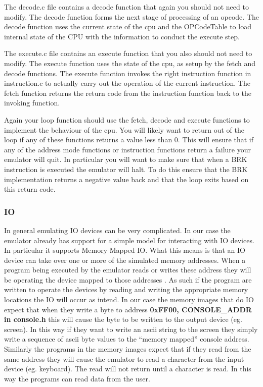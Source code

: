 \documentclass[11pt]{article}
\begin{document}
{The decode.c file contains a decode function that again you should not need
to modify.  The decode function forms the next stage
of processing of an opcode.  The decode function uses the current
state of the cpu and the OPCodeTable to load internal state of the
CPU with the information to conduct the execute step.

The execute.c file contains an execute function that you also should not
need to modify.  The execute function uses the state of
the cpu, as setup by the fetch and decode functions.  The execute
function invokes the right instruction function in instruction.c
to actually carry out the operation of the current instruction.  The
fetch function returns the return code from the instruction function
back to the invoking function.  

Again your loop function should use the fetch, decode and execute
functions to implement the behaviour of the cpu.  You will likely want
to return out of the loop if any of these functions returns a value
less than 0.  This will ensure that if any of the address mode
functions or instruction functions return a failure your emulator will
quit.  In particular you will want to make sure that when a BRK
instruction is executed the emulator will halt.  To do this ensure
that the BRK implementation returns a negative value back and that the
loop exits based on this return code. 

\subsubsection{IO}

In general emulating IO devices can be very complicated.  In our case
the emulator already has support for a simple model for interacting
with IO devices.  In particular it supports Memory Mapped IO.  What
this means is that an IO device can take over one or more of the
simulated memory addresses.  When a program being executed by the
emulator reads or writes these address they will be operating the
device mapped to those addresses .  As such if the program are written
to operate the devices by reading and writing the appropriate memory
locations the IO will occur as intend.  In our case the memory images
that do IO expect that when they write a byte to address {\bf 0xFF00,
  CONSOLE\_ADDR in console.h} this will cause the byte to be written
to the output device (eg. screen).  In this way if they want to write
an ascii string to the screen they simply write a sequence of ascii
byte values to the ``memory mapped'' console address.  Similarly the
programs in the memory images expect that if they read from the same
address they will cause the emulator to read a character from the input
device (eg. keyboard). The read will not return until a character is
read.  In this way the programs can read data from the user.

}
\end{document}
